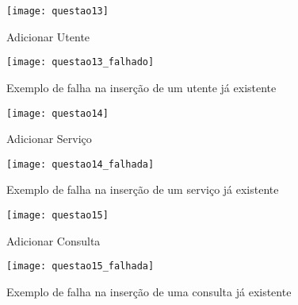   \begin{minipage}{\linewidth}
  	\centering
  	\begin{minipage}{0.45\linewidth}
  		\begin{figure}[H]
  			\texttt{[image: questao13]}
  			\caption{Adicionar Utente}
  		\end{figure}
  	\end{minipage}
  	\hspace{0.05\linewidth}
  	\begin{minipage}{0.45\linewidth}
  		\begin{figure}[H]
  			\texttt{[image: questao13\_falhado]}
  			\caption{Exemplo de falha na inserção de um utente já existente}
  		\end{figure}
  	\end{minipage}
  \end{minipage}


  \begin{minipage}{\linewidth}
  	\centering
  	\begin{minipage}{0.45\linewidth}
  		\begin{figure}[H]
  			\texttt{[image: questao14]}
  			\caption{Adicionar Serviço}
  		\end{figure}
  	\end{minipage}
  	\hspace{0.05\linewidth}
  	\begin{minipage}{0.45\linewidth}
  		\begin{figure}[H]
  			\texttt{[image: questao14\_falhada]}
  			\caption{Exemplo de falha na inserção de um serviço já existente}
  		\end{figure}
  	\end{minipage}
  \end{minipage}

  \begin{minipage}{\linewidth}
  	\centering
  	\begin{minipage}{0.45\linewidth}
  		\begin{figure}[H]
  			\texttt{[image: questao15]}
  			\caption{Adicionar Consulta}
  		\end{figure}
  	\end{minipage}
  	\hspace{0.05\linewidth}
  	\begin{minipage}{0.45\linewidth}
  		\begin{figure}[H]
  			\texttt{[image: questao15\_falhada]}
  			\caption{Exemplo de falha na inserção de uma consulta já existente}
  		\end{figure}
  	\end{minipage}
  \end{minipage}


